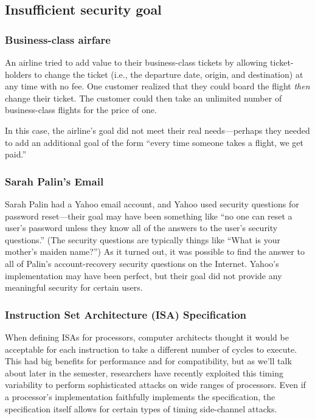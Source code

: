 \subsection{Insufficient security goal}
\subsubsection{Business-class airfare}
An airline tried to add value to their
business-class tickets by allowing ticket-holders to 
change the ticket (i.e., the departure date, origin, and destination)
at any time with no fee.
One customer realized that they could board the flight
\textit{then} change their ticket.
The customer could then take an unlimited number of
business-class flights for the price of one.

In this case, the airline's goal did not meet
their real needs---perhaps they needed to add
an additional goal of the form ``every time someone takes a flight,
we get paid.''

\subsubsection{Sarah Palin's Email}
Sarah Palin had a Yahoo email account, and Yahoo
used security questions for password reset---their
goal may have been something like ``no one can
reset a user's password unless they know all of
the answers to the user's security questions.''
(The security questions are typically things like
``What is your mother's maiden name?'')
As it turned out, it was possible to find the answer
to all of Palin's account-recovery security questions 
on the Internet.\autocite{palin}
Yahoo's implementation may have been perfect, but their
goal did not provide any meaningful security for certain users.

\subsubsection{Instruction Set Architecture (ISA) Specification}
When defining ISAs for processors, computer architects
thought it would be acceptable for each instruction
to take a different number of cycles to execute.
This had big benefits for performance and for
compatibility, but as we'll talk about later in
the semester, researchers have recently exploited
this timing variability to perform sophisticated
attacks on wide ranges of processors.\autocite{hill:spectre-meltdown}
Even if a processor's implementation faithfully implements
the specification, the specification itself
allows for certain types of timing side-channel attacks.

